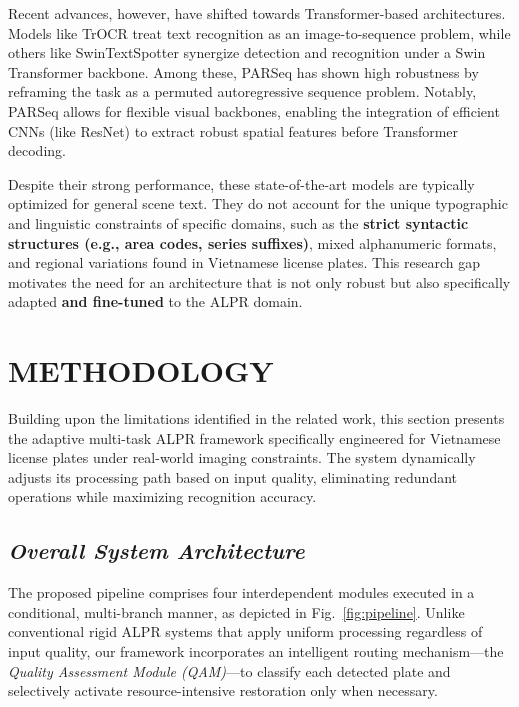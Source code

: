 \documentclass[a4paper,11pt,twocolumn]{article}
\begin{document}
	Recent advances, however, have shifted towards Transformer-based architectures. Models like TrOCR \cite{Li2021TrOCRTO} treat text recognition as an image-to-sequence problem, while others like SwinTextSpotter \cite{Huang2022SwinTextSpotterST} synergize detection and recognition under a Swin Transformer backbone. Among these, PARSeq \cite{Bautista2022SceneTR} has shown high robustness by reframing the task as a permuted autoregressive sequence problem. Notably, PARSeq allows for flexible visual backbones, enabling the integration of efficient CNNs (like ResNet) to extract robust spatial features before Transformer decoding.
	
	Despite their strong performance, these state-of-the-art models are typically optimized for general scene text. They do not account for the unique typographic and linguistic constraints of specific domains, such as the \textbf{strict syntactic structures (e.g., area codes, series suffixes)}, mixed alphanumeric formats, and regional variations found in Vietnamese license plates. This research gap motivates the need for an architecture that is not only robust but also specifically adapted \textbf{and fine-tuned} to the ALPR domain.
	
	\section{METHODOLOGY}
	
	Building upon the limitations identified in the related work, this section presents the adaptive multi-task ALPR framework specifically engineered for Vietnamese license plates under real-world imaging constraints. The system dynamically adjusts its processing path based on input quality, eliminating redundant operations while maximizing recognition accuracy.
	
	\subsection{\textit{Overall System Architecture}}
	
	The proposed pipeline comprises four interdependent modules executed in a conditional, multi-branch manner, as depicted in Fig.~\ref{fig:pipeline}. Unlike conventional rigid ALPR systems that apply uniform processing regardless of input quality, our framework incorporates an intelligent routing mechanism—the \textit{Quality Assessment Module (QAM)}—to classify each detected plate and selectively activate resource-intensive restoration only when necessary.
	
\end{document}
